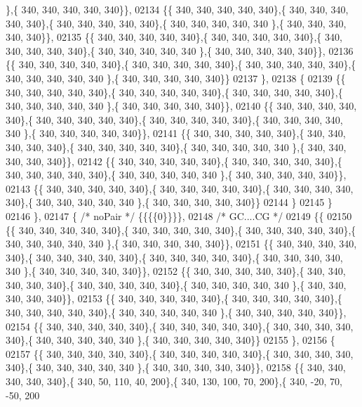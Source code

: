 \begin{DoxyCode}
      \},\{ 340, 340, 340, 340, 340\}\},
02134 \{\{ 340, 340, 340, 340, 340\},\{ 340, 340, 340, 340, 340\},\{ 340, 340, 340, 340, 340\},\{ 340, 340, 340, 340, 340
      \},\{ 340, 340, 340, 340, 340\}\},
02135 \{\{ 340, 340, 340, 340, 340\},\{ 340, 340, 340, 340, 340\},\{ 340, 340, 340, 340, 340\},\{ 340, 340, 340, 340, 340
      \},\{ 340, 340, 340, 340, 340\}\},
02136 \{\{ 340, 340, 340, 340, 340\},\{ 340, 340, 340, 340, 340\},\{ 340, 340, 340, 340, 340\},\{ 340, 340, 340, 340, 340
      \},\{ 340, 340, 340, 340, 340\}\}
02137 \},
02138 \{
02139 \{\{ 340, 340, 340, 340, 340\},\{ 340, 340, 340, 340, 340\},\{ 340, 340, 340, 340, 340\},\{ 340, 340, 340, 340, 340
      \},\{ 340, 340, 340, 340, 340\}\},
02140 \{\{ 340, 340, 340, 340, 340\},\{ 340, 340, 340, 340, 340\},\{ 340, 340, 340, 340, 340\},\{ 340, 340, 340, 340, 340
      \},\{ 340, 340, 340, 340, 340\}\},
02141 \{\{ 340, 340, 340, 340, 340\},\{ 340, 340, 340, 340, 340\},\{ 340, 340, 340, 340, 340\},\{ 340, 340, 340, 340, 340
      \},\{ 340, 340, 340, 340, 340\}\},
02142 \{\{ 340, 340, 340, 340, 340\},\{ 340, 340, 340, 340, 340\},\{ 340, 340, 340, 340, 340\},\{ 340, 340, 340, 340, 340
      \},\{ 340, 340, 340, 340, 340\}\},
02143 \{\{ 340, 340, 340, 340, 340\},\{ 340, 340, 340, 340, 340\},\{ 340, 340, 340, 340, 340\},\{ 340, 340, 340, 340, 340
      \},\{ 340, 340, 340, 340, 340\}\}
02144 \}
02145 \}
02146 \},
02147 \{ \textcolor{comment}{/* noPair */} \{\{\{\{0\}\}\}\},
02148 \textcolor{comment}{/* GC....CG */}
02149 \{\{
02150 \{\{ 340, 340, 340, 340, 340\},\{ 340, 340, 340, 340, 340\},\{ 340, 340, 340, 340, 340\},\{ 340, 340, 340, 340, 340
      \},\{ 340, 340, 340, 340, 340\}\},
02151 \{\{ 340, 340, 340, 340, 340\},\{ 340, 340, 340, 340, 340\},\{ 340, 340, 340, 340, 340\},\{ 340, 340, 340, 340, 340
      \},\{ 340, 340, 340, 340, 340\}\},
02152 \{\{ 340, 340, 340, 340, 340\},\{ 340, 340, 340, 340, 340\},\{ 340, 340, 340, 340, 340\},\{ 340, 340, 340, 340, 340
      \},\{ 340, 340, 340, 340, 340\}\},
02153 \{\{ 340, 340, 340, 340, 340\},\{ 340, 340, 340, 340, 340\},\{ 340, 340, 340, 340, 340\},\{ 340, 340, 340, 340, 340
      \},\{ 340, 340, 340, 340, 340\}\},
02154 \{\{ 340, 340, 340, 340, 340\},\{ 340, 340, 340, 340, 340\},\{ 340, 340, 340, 340, 340\},\{ 340, 340, 340, 340, 340
      \},\{ 340, 340, 340, 340, 340\}\}
02155 \},
02156 \{
02157 \{\{ 340, 340, 340, 340, 340\},\{ 340, 340, 340, 340, 340\},\{ 340, 340, 340, 340, 340\},\{ 340, 340, 340, 340, 340
      \},\{ 340, 340, 340, 340, 340\}\},
02158 \{\{ 340, 340, 340, 340, 340\},\{ 340,  50, 110,  40, 200\},\{ 340, 130, 100,  70, 200\},\{ 340, -20,  70, -50, 200

\end{DoxyCode}
